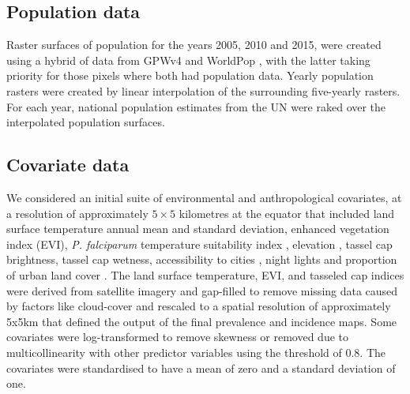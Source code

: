 \documentclass{statsoc}
\begin{document}
\subsection*{Population data}

Raster surfaces of population for the years 2005, 2010 and 2015, were created using a hybrid of data from GPWv4 \citep{gpw4} and WorldPop \citep{tatem2017worldpop}, with the latter taking priority for those pixels where both had population data. 
Yearly population rasters were created by linear interpolation of the surrounding five-yearly rasters.
For each year, national population estimates from the UN were raked over the interpolated population surfaces. 


\subsection*{Covariate data}

We considered an initial suite of environmental and anthropological covariates, at a resolution of approximately $5 \times 5$ kilometres at the equator that included land surface temperature annual mean and standard deviation, enhanced vegetation index (EVI), \emph{P. falciparum} temperature suitability index \citep{weiss2014air}, elevation \citep{SRTMElev}, tassel cap brightness, tassel cap wetness, accessibility to cities \citep{weiss2018global}, night lights \citep{elvidge2017viirs} and proportion of urban land cover \citep{GUF}. %
The land surface temperature, EVI, and tasseled cap indices were derived from satellite imagery and gap-filled to remove missing data caused by factors like cloud-cover \citep{weiss2014effective} and rescaled to a spatial resolution of approximately 5x5km \citep{weiss2015re} that defined the output of the final prevalence and incidence maps.
Some covariates were log-transformed to remove skewness or removed due to multicollinearity with other predictor variables using the threshold of 0.8. %
The covariates were standardised to have a mean of zero and a standard deviation of one.
\end{document}

